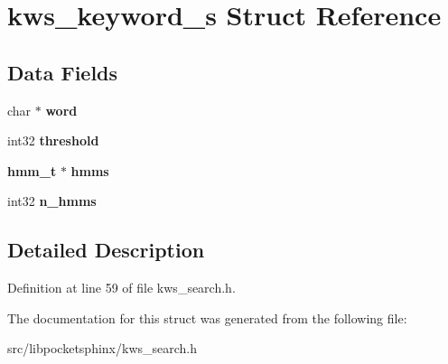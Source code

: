 \section{kws\-\_\-keyword\-\_\-s Struct Reference}
\label{structkws__keyword__s}
\subsection*{Data Fields}
\begin{DoxyCompactItemize}
\item 
char $\ast$ {\bfseries word}\label{structkws__keyword__s_a7550b0ed8c435c23d87775d918835643}

\item 
int32 {\bfseries threshold}\label{structkws__keyword__s_a0b1f32994f66007b2cc4cd5821c97338}

\item 
{\bf hmm\-\_\-t} $\ast$ {\bfseries hmms}\label{structkws__keyword__s_a9a8d85824c151cedf89fc16d634eac91}

\item 
int32 {\bfseries n\-\_\-hmms}\label{structkws__keyword__s_a41c3ea132452b11712ff77a9ed917750}

\end{DoxyCompactItemize}


\subsection{Detailed Description}


Definition at line 59 of file kws\-\_\-search.\-h.



The documentation for this struct was generated from the following file\-:\begin{DoxyCompactItemize}
\item 
src/libpocketsphinx/kws\-\_\-search.\-h\end{DoxyCompactItemize}
